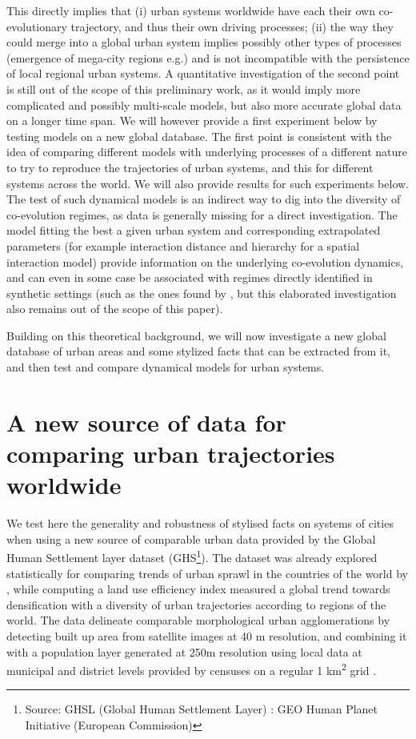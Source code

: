 \documentclass[11pt]{article}
\begin{document}
This directly implies that (i) urban systems worldwide have each their own co-evolutionary trajectory, and thus their own driving processes; (ii) the way they could merge into a global urban system implies possibly other types of processes (emergence of mega-city regions e.g.) and is not incompatible with the persistence of local regional urban systems. A quantitative investigation of the second point is still out of the scope of this preliminary work, as it would imply more complicated and possibly multi-scale models, but also more accurate global data on a longer time span. We will however provide a first experiment below by testing models on a new global database. The first point is consistent with the idea of comparing different models with underlying processes of a different nature to try to reproduce the trajectories of urban systems, and this for different systems across the world. We will also provide results for such experiments below. The test of such dynamical models is an indirect way to dig into the diversity of co-evolution regimes, as data is generally missing for a direct investigation. The model fitting the best a given urban system and corresponding extrapolated parameters (for example interaction distance and hierarchy for a spatial interaction model) provide information on the underlying co-evolution dynamics, and can even in some case be associated with regimes directly identified in synthetic settings (such as the ones found by \cite{raimbault2018modeling}, but this elaborated investigation also remains out of the scope of this paper).

Building on this theoretical background, we will now investigate a new global database of urban areas and some stylized facts that can be extracted from it, and then test and compare dynamical models for urban systems.


\section{A new source of data for comparing urban trajectories worldwide}

We test here the generality and robustness of stylised facts on systems of cities when using a new source of comparable urban data provided by the Global Human Settlement layer dataset (GHS\footnote{Source: GHSL (Global Human Settlement Layer) : GEO Human Planet Initiative (European Commission)}). The dataset was already explored statistically for comparing trends of urban sprawl in the countries of the world by \cite{denis2020population}, while \cite{melchiorri2019principles} computing a land use efficiency index measured a global trend towards densification with a diversity of urban trajectories according to regions of the world. The data delineate comparable morphological urban agglomerations by detecting built up area from satellite images at 40 m resolution, and combining it with a population layer generated at 250m resolution using local data at municipal and district levels provided by censuses on a regular 1 km\textsuperscript{2} grid \cite{dijkstra2014harmonised}. 
\end{document}
